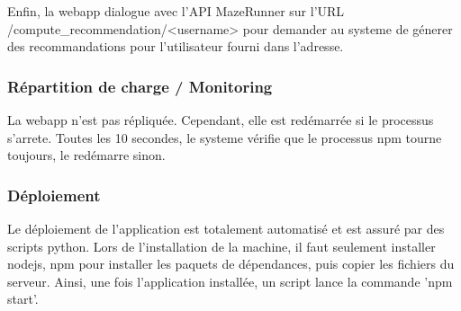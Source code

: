 Enfin, la webapp dialogue avec l'API MazeRunner sur l'URL /compute_recommendation/<username> pour demander au systeme de génerer des recommandations pour l'utilisateur fourni dans l'adresse.

\subsubsection{Répartition de charge / Monitoring}

La webapp n'est pas répliquée. Cependant, elle est redémarrée si le processus s'arrete. Toutes les 10 secondes, le systeme vérifie que le processus npm tourne toujours, le redémarre sinon.

\subsubsection{Déploiement}

Le déploiement de l'application est totalement automatisé et est assuré par des scripts python.
Lors de l'installation de la machine, il faut seulement installer nodejs, npm pour installer les paquets de dépendances, puis copier les fichiers du serveur.
Ainsi, une fois l'application installée, un script lance la commande 'npm start'.
